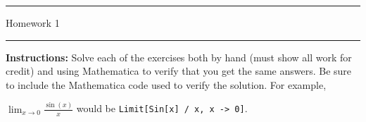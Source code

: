 \documentclass[letterpaper,12pt]{article}
\begin{document}
\thispagestyle{empty}

\hrule \vspace{0.5em}
 \hfill Homework 1 \newline \hrule

\vspace{1em}
\textbf{Instructions:} Solve each of the exercises both by hand (must show all work for credit) and using Mathematica to verify that you get the same answers. Be sure to include the Mathematica code used to verify the solution. For example,
\begin{center}
$\displaystyle \lim_{x \rightarrow 0} \frac{\sin(x)}{x}$ \hspace{1em} would be \hspace{1em} \texttt{Limit[Sin[x] / x, x -> 0]}.
\end{center}

\vspace{1em}
\end{document}
